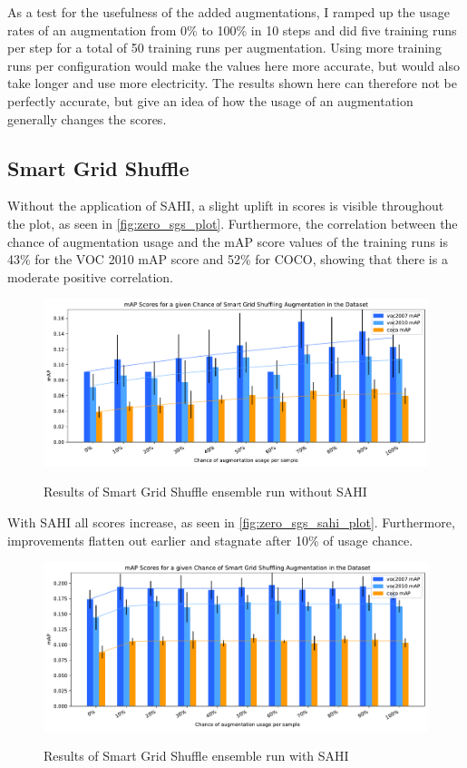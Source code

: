 \documentclass[10pt]{book}
\begin{document}
As a test for the usefulness of the added augmentations, I ramped up the usage rates of an augmentation from 0\% to 100\% in 10 steps and did five training runs per step for a total of 50 training runs per augmentation. Using more training runs per configuration would make the values here more accurate, but would also take longer and use more electricity. The results shown here can therefore not be perfectly accurate, but give an idea of how the usage of an augmentation generally changes the scores.

\subsection{Smart Grid Shuffle}

Without the application of \ac{SAHI}, a slight uplift in scores is visible throughout the plot, as seen in \autoref{fig:zero_sgs_plot}. Furthermore, the correlation between the chance of augmentation usage and the \ac{mAP} score values of the training runs is 43\% for the VOC 2010 \ac{mAP} score and 52\% for \ac{COCO}, showing that there is a moderate positive correlation.

\begin{figure}
  \caption{Results of Smart Grid Shuffle ensemble run without \ac{SAHI}}
  \includegraphics[width=\textwidth]{image/zero-based-sgs-ensemble-2-thesis}
  \label{fig:zero_sgs_plot}
\end{figure}

With \ac{SAHI} all scores increase, as seen in \autoref{fig:zero_sgs_sahi_plot}. Furthermore, improvements flatten out earlier and stagnate after 10\% of usage chance.

\begin{figure}
  \caption{Results of Smart Grid Shuffle ensemble run with \ac{SAHI}}
  \includegraphics[width=\textwidth]{image/zero-based-sgs-sahi-ensemble-2-thesis}
  \label{fig:zero_sgs_sahi_plot}
\end{figure}
\end{document}

